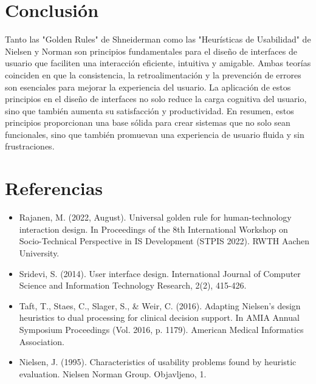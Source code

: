 \documentclass[10pt]{osa-supplemental-document}
\begin{document}
\section{Conclusión}
Tanto las "Golden Rules" de Shneiderman como las "Heurísticas de Usabilidad" de Nielsen y Norman son principios fundamentales para el diseño de interfaces de usuario que faciliten una interacción eficiente, intuitiva y amigable. Ambas teorías coinciden en que la consistencia, la retroalimentación y la prevención de errores son esenciales para mejorar la experiencia del usuario. La aplicación de estos principios en el diseño de interfaces no solo reduce la carga cognitiva del usuario, sino que también aumenta su satisfacción y productividad. En resumen, estos principios proporcionan una base sólida para crear sistemas que no solo sean funcionales, sino que también promuevan una experiencia de usuario fluida y sin frustraciones.


\section{Referencias}
\begin{itemize}
    \item Rajanen, M. (2022, August). Universal golden rule for human-technology interaction design. In Proceedings of the 8th International Workshop on Socio-Technical Perspective in IS Development (STPIS 2022). RWTH Aachen University.
    \item Sridevi, S. (2014). User interface design. International Journal of Computer Science and Information Technology Research, 2(2), 415-426.
    \item Taft, T., Staes, C., Slager, S., & Weir, C. (2016). Adapting Nielsen’s design heuristics to dual processing for clinical decision support. In AMIA Annual Symposium Proceedings (Vol. 2016, p. 1179). American Medical Informatics Association.
    \item Nielsen, J. (1995). Characteristics of usability problems found by heuristic evaluation. Nielsen Norman Group. Objavljeno, 1.
\end{itemize}
\end{document}
